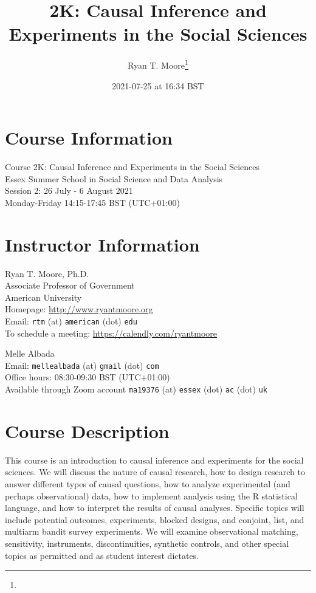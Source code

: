 \documentclass[11pt]{article}
\title{2K: Causal Inference and Experiments in the Social Sciences}
\author{Ryan T. Moore\footnote{\rtmaddr}}
\date{2021-07-25 at 16:34 BST}
\begin{document}
\maketitle

\section*{Course Information}
Course 2K: Causal Inference and Experiments in the Social Sciences\\
Essex Summer School in Social Science and Data Analysis\\
Session 2: 26 July - 6 August 2021\\
Monday-Friday 14:15-17:45 BST (UTC+01:00)

\section*{Instructor Information}
Ryan T. Moore, Ph.D. \\
Associate Professor of Government\\
American University\\
Homepage: \url{http://www.ryantmoore.org} \\
Email: {\tt rtm} (at) {\tt american} (dot) {\tt edu} \\
To schedule a meeting: \url{https://calendly.com/ryantmoore}\\

\vspace{.1in}

\noindent Melle Albada\\
Email: {\tt mellealbada} (at) {\tt gmail} (dot) {\tt com} \\
Office hours: 08:30-09:30 BST (UTC+01:00) \\
Available through Zoom account {\tt ma19376} (at) {\tt essex} (dot) {\tt ac} (dot) {\tt uk}



\section*{Course Description}

This course is an introduction to causal inference and experiments for the social sciences.  We will discuss the nature of causal research, how to design research to answer different types of causal questions, how to analyze experimental (and perhaps observational) data, how to implement analysis using the R statistical language, and how to interpret the results of causal analyses.  Specific topics will include potential outcomes, experiments, blocked designs, and conjoint, list, and multiarm bandit survey experiments.  We will examine observational matching, sensitivity, instruments, discontinuities, synthetic controls, and other special topics as permitted and as student interest dictates.
\end{document}
